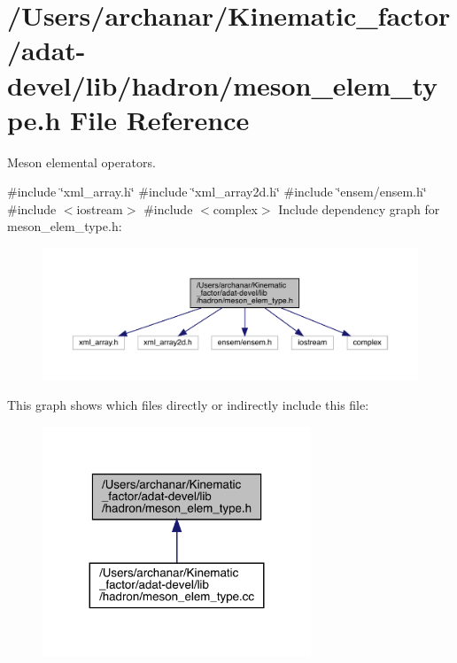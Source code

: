 \hypertarget{adat-devel_2lib_2hadron_2meson__elem__type_8h}{}\section{/\+Users/archanar/\+Kinematic\+\_\+factor/adat-\/devel/lib/hadron/meson\+\_\+elem\+\_\+type.h File Reference}
\label{adat-devel_2lib_2hadron_2meson__elem__type_8h}


Meson elemental operators.  


{\ttfamily \#include \char`\"{}xml\+\_\+array.\+h\char`\"{}}\newline
{\ttfamily \#include \char`\"{}xml\+\_\+array2d.\+h\char`\"{}}\newline
{\ttfamily \#include \char`\"{}ensem/ensem.\+h\char`\"{}}\newline
{\ttfamily \#include $<$iostream$>$}\newline
{\ttfamily \#include $<$complex$>$}\newline
Include dependency graph for meson\+\_\+elem\+\_\+type.\+h\+:
\nopagebreak
\begin{figure}[H]
\begin{center}
\leavevmode
\includegraphics[width=350pt]{df/d15/adat-devel_2lib_2hadron_2meson__elem__type_8h__incl}
\end{center}
\end{figure}
This graph shows which files directly or indirectly include this file\+:
\nopagebreak
\begin{figure}[H]
\begin{center}
\leavevmode
\includegraphics[width=227pt]{dc/de2/adat-devel_2lib_2hadron_2meson__elem__type_8h__dep__incl}
\end{center}
\end{figure}
